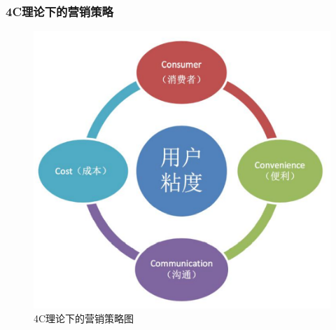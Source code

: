 \documentclass[master]{hduthesis}
\begin{document}
\subsubsection{4C理论下的营销策略}
\begin{figure}[H]
	\centering
	\includegraphics{marketing}
	\caption{4C理论下的营销策略图}
\end{figure}
\end{document}
